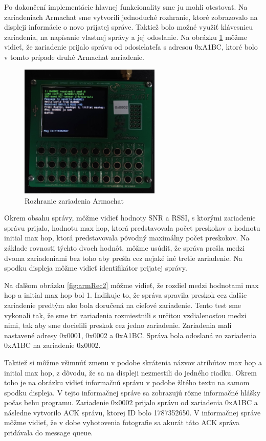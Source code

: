 \documentclass[slovak,master]{diploma}
\begin{document}
Po dokončení implementácie hlavnej funkcionality sme ju mohli otestovať. Na zariadeniach Armachat sme vytvorili jednoduché rozhranie, 
ktoré zobrazovalo na displeji informácie o novo prijatej správe. Taktiež bolo možné využiť klávesnicu zariadenia, na napísanie vlastnej správy a jej odoslanie.
Na obrázku \ref{fig:armRec} môžme vidieť, že zariadenie prijalo správu od odosielateľa s adresou 0xA1BC, ktoré bolo v tomto prípade druhé Armachat zariadenie.
\newpage
\begin{figure}
	\centering
	\includegraphics[width=0.6\textwidth]{Figures/armRec.jpg}
	\caption{Rozhranie zariadenia Armachat}
	\label{fig:armRec}
\end{figure}

Okrem obsahu správy, môžme vidieť hodnoty SNR a RSSI, s ktorými zariadenie správu prijalo, hodnotu max hop, ktorá predstavovala počet preskokov a hodnotu initial max hop, 
ktorá predstavovala pôvodný maximálny počet preskokov. Na základe rovnosti týchto dvoch hodnôt, môžme usúdiť, že správa prešla medzi dvoma zariadeniami bez toho aby prešla 
cez nejaké iné tretie zariadenie. Na spodku displeja môžme vidieť identifikátor prijatej správy.

Na ďalšom obrázku \ref{fig:armRec2} môžme vidieť, že rozdiel medzi hodnotami max hop a initial max hop bol 1. Indikuje to, že správa spravila preskok cez ďalšie zariadenie predtým ako 
bola doručená na cieľové zariadenie. Tento test sme vykonali tak, že sme tri zariadenia rozmiestnili s určitou vzdialenosťou medzi nimi, tak aby sme docielili preskok cez jedno zariadenie. 
Zariadenia mali nastavené adresy 0x0001, 0x0002 a 0xA1BC. Správa bola odoslaná zo zariadenia 0xA1BC na zariadenie 0x0002.

Taktiež si môžme všimnúť zmenu v podobe skrátenia názvov atribútov max hop a initial max hop, z dôvodu, že sa na displeji nezmestili do jedného riadku.
Okrem toho je na obrázku vidieť informačnú správu v podobe žltého textu na samom spodku displeja. V tejto informačnej správe sa zobrazujú 
rôzne informačné hlášky počas behu programu. Zariadenie 0x0002 prijalo správu od zariadenia 0xA1BC a následne vytvorilo ACK správu, ktorej ID bolo 1787352650.
V informačnej správe môžme vidieť, že v dobe vyhotovenia fotografie sa akurát táto ACK správa pridávala do message queue.
\newpage
\end{document}
